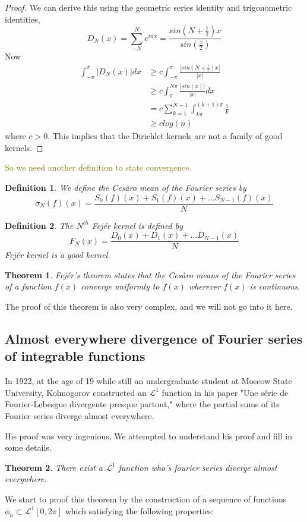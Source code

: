 \documentclass{article}
\newtheorem{theorem}{Theorem}
\newtheorem{definition}{Definition}
\begin{document}
\begin{proof}
    We can derive this using the geometric series identity and trigonometric identities, \[D_N(x)=\sum\limits_{-N}^{N}e^{inx}=\frac{sin(N+\frac{1}{2})x}{sin(\frac{x}{2})}\]
    Now
     \begin{align*}
        \int_{-\pi}^{\pi}\left\lvert D_N(x) \right\rvert dx &\geqslant c \int_{-\pi}^{\pi}\frac{\left\lvert sin(N+\frac{1}{2})x \right\rvert}{\left\lvert x \right\rvert}\\
        &\geqslant c \int_{\pi}^{N\pi}\frac{|sin(x)|}{|x|}dx\\
        &= c\sum_{k=1}^{N-1}\int_{k\pi}^{(k+1)\pi}\frac{1}{k}\\
        &\geqslant clog(n)
    \end{align*}
    where $c > 0$. This implies that the Dirichlet kernels are not a family of good kernels.
\end{proof}
\textcolor{olive}{So we need another definition to state convergence.}
\par
\begin{definition}
    We define the Cesàro mean of the Fourier series by 
    \[ \sigma_N(f)(x)=\frac{S_0(f)(x)+S_1(f)(x)+\dots S_{N-1}(f)(x)}{N} \]
\end{definition}

\begin{definition}
    The $ N^{th}  $ Fejér kernel is defined by 
    \[ F_N(x)= \frac{D_0(x)+D_1(x)+\dots D_{N-1}(x)}{N}\]
    Fejér kernel is a good kernel.
\end{definition}

\begin{theorem}
    Fejér's theorem states that the Cesàro means of the Fourier series of a function $f(x) $ converge uniformly to $f(x)$ wherever $f(x)$ is continuous.
\end{theorem}

The proof of this theorem is also very complex, and we will not go into it here.





\subsection{Almost everywhere divergence of Fourier series of integrable functions}
In 1922, at the age of 19 while still an undergraduate student at Moscow State University, Kolmogorov constructed an $ \mathcal{L} ^1 $ function in his paper "Une série de Fourier-Lebesgue divergente presque partout," where the partial sums of its Fourier series diverge almost everywhere. 
\par
His proof was very ingenious. We attempted to understand his proof and fill in some details.
\begin{theorem}
    There exist a $ \mathcal{L} ^1 $ function who's fourier series diverge almost everywhere. 
\end{theorem}
We start to proof this theorem by the construction of a sequence of functions $ \phi _n  \subset  \mathcal{L} ^1[0,2\pi] $ which satisfying the following properties:
\end{document}
